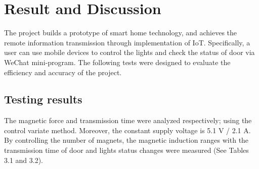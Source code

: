 \documentclass[12pt,a4paper]{report}
\begin{document}
\chapter{Result and Discussion}
The project builds a prototype of smart home technology, and achieves the remote information transmission through implementation of IoT. Specifically, a user can use mobile devices to control the lights and check the status of door via WeChat mini-program. The following tests were designed to evaluate the efficiency and accuracy of the project.
\section{Testing results}
The magnetic force and transmission time were analyzed respectively; using the control variate method. Moreover, the constant supply voltage is 5.1 V / 2.1 A. By controlling the number of magnets, the magnetic induction ranges with the transmission time of door and lights status changes were measured (See Tables 3.1 and 3.2). 
\end{document}
